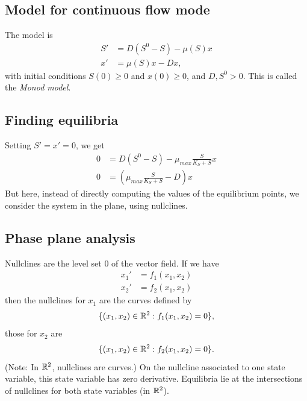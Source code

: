 \subsection{Model for continuous flow mode}
The model is
\begin{subequations}\label{sys:chemo_flow}
\begin{align}
S' &= D(S^0-S)-\mu(S)x \\
x' &= \mu(S)x-Dx,
\end{align}
\end{subequations}
with initial conditions $S(0)\geq 0$ and $x(0)\geq 0$, and $D,S^0>0$. This is called the \emph{Monod model}.


\subsection{Finding equilibria}
Setting $S'=x'=0$, we get
\begin{align*}
0&=D(S^0-S)-\mu_{max}\frac{S}{K_S+S}x \\
0&=\left(\mu_{max}\frac{S}{K_S+S}-D\right)x
\end{align*}
But here, instead of directly computing the values of the equilibrium points, we consider the system in the plane, using nullclines.


\subsection{Phase plane analysis}
Nullclines are the level set 0 of the vector field. If we have
\begin{align*}
x_1' &= f_1(x_1,x_2) \\
x_2' &= f_2(x_1,x_2)
\end{align*}
then the nullclines for $x_1$ are the curves defined by 
\[
\{(x_1,x_2)\in\mathbb{R}^2:f_1(x_1,x_2)=0\},
\]
those for $x_2$ are
\[
\{(x_1,x_2)\in\mathbb{R}^2:f_2(x_1,x_2)=0\}.
\]
(Note: In $\mathbb{R}^2$, nullclines are curves.)
On the nullcline associated to one state variable, this state variable has zero derivative.
Equilibria lie at the intersections of nullclines for both state variables (in $\mathbb{R}^2$).


